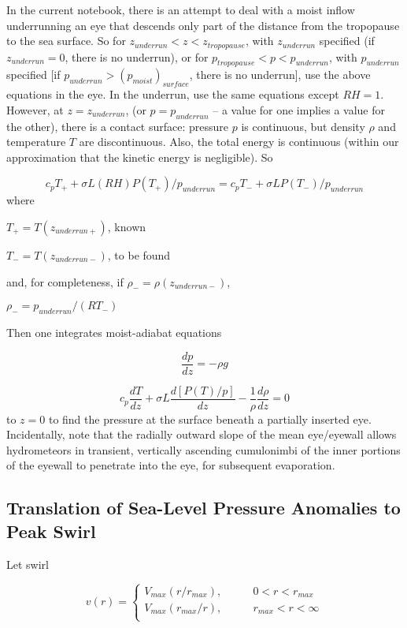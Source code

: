 \documentclass[preprint, prX]{revtex4}
\newcommand{\dd}[2]{\frac{d#1}{d#2}}
\begin{document}
In the current notebook, there is an attempt to deal with a moist inflow underrunning an eye that descends only part of the distance from the tropopause to the sea surface. So for $z_{underrun} < z < z_{tropopause}$, with $z_{underrun}$ specified (if $z_{underrun}=0$, there is no underrun), or for $p_{tropopause} < p < p_{underrun}$, with $p_{underrun}$ specified [if $p_{underrun} > (p_{moist})_{surface}$, there is no underrun], use the above equations in the eye. In the underrun, use the same equations except $RH=1$. However, at $z=z_{underrun}$, (or $p=p_{underrun}$ -- a value for one implies a value for the other), there is a contact surface: pressure $p$ is continuous, but density $\rho$ and temperature $T$ are discontinuous. Also, the total energy is continuous (within our approximation that the kinetic energy is negligible). So

\begin{equation}
	c_p T_+ + \sigma L (RH) P(T_+) / p_{underrun} = c_p T_- + \sigma L P(T_-) / p_{underrun}
\end{equation}
where

$T_+ = T(z_{underrun+})$, known

$T_- = T(z_{underrun-})$, to be found

\noindent and, for completeness, if $\rho_- = \rho(z_{underrun-})$,

$\rho_- = p_{underrun} / (RT_-)$

Then one integrates moist-adiabat equations

\begin{equation}
	\dd{p}{z} = -\rho g
\end{equation}

\begin{equation}
	c_p \dd{T}{z} + \sigma L \dd{[P(T)/p]}{z} - \frac{1}{\rho}\dd{\rho}{z} = 0
\end{equation}
to $z=0$ to find the pressure at the surface beneath a partially inserted eye. Incidentally, note that the radially outward slope of the mean eye/eyewall allows hydrometeors in transient, vertically ascending cumulonimbi of the inner portions of the eyewall to penetrate into the eye, for subsequent evaporation.

\subsection{Translation of Sea-Level Pressure Anomalies to Peak Swirl}


Let swirl 

\begin{equation}
v(r) = 
\begin{cases} 
      V_{max}(r/r_{max}), \qquad & 0 < r < r_{max} \\
      V_{max}(r_{max}/r),\qquad & r_{max} < r < \infty \\
   \end{cases}
\end{equation}
\end{document}

